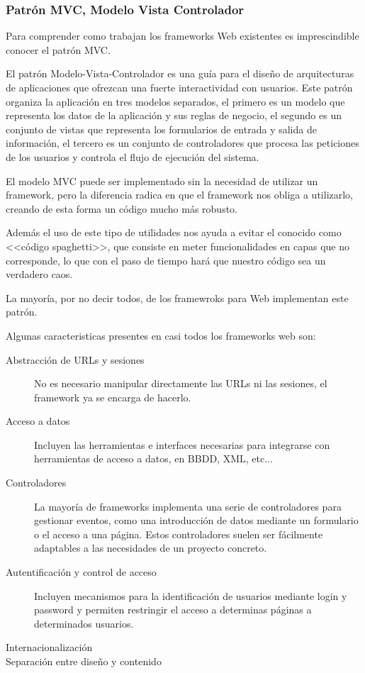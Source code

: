 \subsubsection{Patrón MVC, Modelo Vista Controlador}

Para comprender como trabajan los frameworks Web existentes es imprescindible conocer el patrón MVC.

El patrón Modelo-Vista-Controlador es una guía para el diseño de arquitecturas de aplicaciones que ofrezcan una fuerte interactividad con usuarios. Este patrón organiza la aplicación en tres modelos separados, el primero es un modelo que representa los datos de la aplicación y sus reglas de negocio, el segundo es un conjunto de vistas que representa los formularios de entrada y salida de información, el tercero es un conjunto de controladores que procesa las peticiones de los usuarios y controla el flujo de ejecución del sistema.

El modelo MVC puede ser implementado sin la necesidad de utilizar un framework, pero la diferencia radica en que el framework nos obliga a utilizarlo, creando de esta forma un código mucho más robusto. 

Además el uso de este tipo de utilidades nos ayuda a evitar el conocido como <<código spaghetti>>, que consiste en meter funcionalidades en capas que no corresponde, lo que con el paso de tiempo hará que nuestro código sea un verdadero caos.

La mayoría, por no decir todos, de los framewroks para Web implementan este patrón. 


Algunas caracteristicas presentes en casi todos los frameworks web son:
\begin{description}
    \item[Abstracción de URLs y sesiones] No es necesario manipular directamente las URLs ni las sesiones, el framework ya se encarga de hacerlo. 
    
    \item[Acceso a datos] Incluyen las herramientas e interfaces necesarias para     integrarse con herramientas de acceso a datos, en BBDD,
    XML, etc... 
    
    \item[Controladores] La mayoría de frameworks implementa una serie de     controladores para gestionar eventos, como una     introducción de datos mediante un formulario o el acceso a     una página. Estos controladores suelen ser fácilmente     adaptables a las necesidades de un proyecto concreto. 
    
    \item[Autentificación y control de acceso] Incluyen mecanismos para la identificación de usuarios mediante login y password y permiten restringir el acceso a     determinas páginas a determinados usuarios. 
   
    \item[Internacionalización]
    
    \item[Separación entre diseño y
    contenido]
\end{description}

